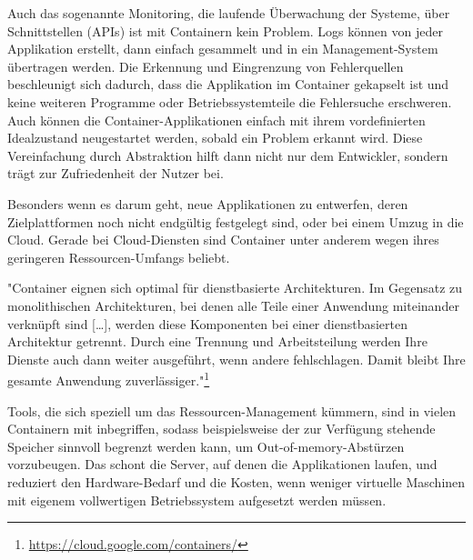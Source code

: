 Auch das sogenannte Monitoring, die laufende Überwachung der Systeme, über Schnittstellen (APIs) ist mit Containern kein Problem. Logs können von jeder Applikation erstellt, dann einfach gesammelt und in ein Management-System übertragen werden. Die Erkennung und Eingrenzung von Fehlerquellen beschleunigt sich dadurch, dass die Applikation im Container gekapselt ist und keine weiteren Programme oder Betriebssystemteile die Fehlersuche erschweren. Auch können die Container-Applikationen einfach mit ihrem vordefinierten Idealzustand neugestartet werden, sobald ein Problem erkannt wird.
Diese Vereinfachung durch Abstraktion hilft dann nicht nur dem Entwickler, sondern trägt zur Zufriedenheit der Nutzer bei. 

Besonders wenn es darum geht, neue Applikationen zu entwerfen, deren Zielplattformen noch nicht endgültig festgelegt sind, oder bei einem Umzug in die Cloud. Gerade bei Cloud-Diensten sind Container unter anderem wegen ihres geringeren Ressourcen-Umfangs beliebt.
\cite{12771285120180201}

"Container eignen sich optimal für dienstbasierte Architekturen. Im Gegensatz zu monolithischen Architekturen, bei denen alle Teile einer Anwendung miteinander verknüpft sind […], werden diese Komponenten bei einer dienstbasierten Architektur getrennt. Durch eine Trennung und Arbeitsteilung werden Ihre Dienste auch dann weiter ausgeführt, wenn andere fehlschlagen. Damit bleibt Ihre gesamte Anwendung zuverlässiger."\footnote{\url{https://cloud.google.com/containers/}}

Tools, die sich speziell um das Ressourcen-Management kümmern, sind in vielen Containern mit inbegriffen, sodass beispielsweise der zur Verfügung stehende Speicher sinnvoll begrenzt werden kann, um Out-of-memory-Abstürzen vorzubeugen. 
Das schont die Server, auf denen die Applikationen laufen, und reduziert den Hardware-Bedarf und die Kosten, wenn weniger virtuelle Maschinen mit eigenem vollwertigen Betriebssystem aufgesetzt werden müssen.
\cite{11517836120160501}